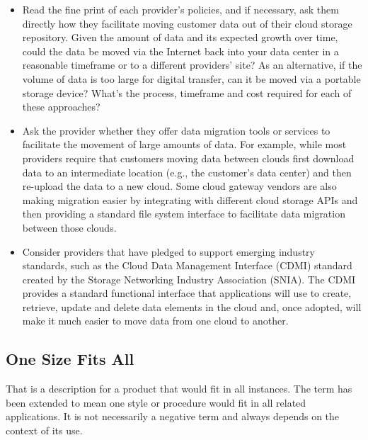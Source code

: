 \begin{itemize}
	\item Read the fine print of each provider's policies, and if
		necessary, ask them directly how they facilitate moving customer
		data out of their cloud storage repository. Given the amount of
		data and its expected growth over time, could the data be moved
		via the Internet back into your data center in a reasonable
		timeframe or to a different providers' site? As an alternative,
		if the volume of data is too large for digital transfer, can it
		be moved via a portable storage device? What's the process,
		timeframe and cost required for each of these approaches?
	\item Ask the provider whether they offer data migration tools or
		services to facilitate the movement of large amounts of data.
		For example, while most providers require that customers moving
		data between clouds first download data to an intermediate
		location (e.g., the customer's data center) and then re-upload
		the data to a new cloud. Some cloud gateway vendors %
		are also
		making migration easier by integrating with different cloud
		storage APIs and then providing a standard file system interface
		to facilitate data migration between those clouds.
	\item Consider providers that have pledged to support emerging
		industry standards, such as the Cloud Data Management Interface
		(CDMI) standard created by the Storage Networking Industry
		Association (SNIA). The CDMI provides a standard functional
		interface that applications will use to create, retrieve, update
		and delete data elements in the cloud and, once adopted, will
		make it much easier to move data from one cloud to another.
\end{itemize}



\subsection{One Size Fits All}

That is a description for a product that would fit in all instances. The
term has been extended to mean one style or procedure would fit in all
related applications. It is not necessarily a negative term and always
depends on the context of its use.


